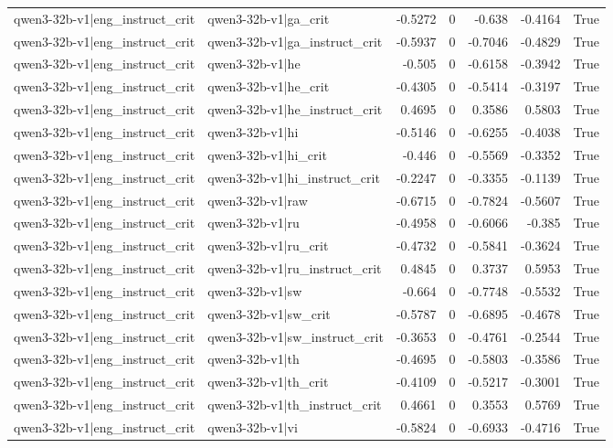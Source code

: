 \begin{table}
\begin{tabular}{l l r r r r l}
qwen3-32b-v1|eng_instruct_crit & qwen3-32b-v1|ga_crit & -0.5272 & 0 & -0.638 & -0.4164 & True \\
qwen3-32b-v1|eng_instruct_crit & qwen3-32b-v1|ga_instruct_crit & -0.5937 & 0 & -0.7046 & -0.4829 & True \\
qwen3-32b-v1|eng_instruct_crit & qwen3-32b-v1|he & -0.505 & 0 & -0.6158 & -0.3942 & True \\
qwen3-32b-v1|eng_instruct_crit & qwen3-32b-v1|he_crit & -0.4305 & 0 & -0.5414 & -0.3197 & True \\
qwen3-32b-v1|eng_instruct_crit & qwen3-32b-v1|he_instruct_crit & 0.4695 & 0 & 0.3586 & 0.5803 & True \\
qwen3-32b-v1|eng_instruct_crit & qwen3-32b-v1|hi & -0.5146 & 0 & -0.6255 & -0.4038 & True \\
qwen3-32b-v1|eng_instruct_crit & qwen3-32b-v1|hi_crit & -0.446 & 0 & -0.5569 & -0.3352 & True \\
qwen3-32b-v1|eng_instruct_crit & qwen3-32b-v1|hi_instruct_crit & -0.2247 & 0 & -0.3355 & -0.1139 & True \\
qwen3-32b-v1|eng_instruct_crit & qwen3-32b-v1|raw & -0.6715 & 0 & -0.7824 & -0.5607 & True \\
qwen3-32b-v1|eng_instruct_crit & qwen3-32b-v1|ru & -0.4958 & 0 & -0.6066 & -0.385 & True \\
qwen3-32b-v1|eng_instruct_crit & qwen3-32b-v1|ru_crit & -0.4732 & 0 & -0.5841 & -0.3624 & True \\
qwen3-32b-v1|eng_instruct_crit & qwen3-32b-v1|ru_instruct_crit & 0.4845 & 0 & 0.3737 & 0.5953 & True \\
qwen3-32b-v1|eng_instruct_crit & qwen3-32b-v1|sw & -0.664 & 0 & -0.7748 & -0.5532 & True \\
qwen3-32b-v1|eng_instruct_crit & qwen3-32b-v1|sw_crit & -0.5787 & 0 & -0.6895 & -0.4678 & True \\
qwen3-32b-v1|eng_instruct_crit & qwen3-32b-v1|sw_instruct_crit & -0.3653 & 0 & -0.4761 & -0.2544 & True \\
qwen3-32b-v1|eng_instruct_crit & qwen3-32b-v1|th & -0.4695 & 0 & -0.5803 & -0.3586 & True \\
qwen3-32b-v1|eng_instruct_crit & qwen3-32b-v1|th_crit & -0.4109 & 0 & -0.5217 & -0.3001 & True \\
qwen3-32b-v1|eng_instruct_crit & qwen3-32b-v1|th_instruct_crit & 0.4661 & 0 & 0.3553 & 0.5769 & True \\
qwen3-32b-v1|eng_instruct_crit & qwen3-32b-v1|vi & -0.5824 & 0 & -0.6933 & -0.4716 & True \\

\end{tabular}
\end{table}
